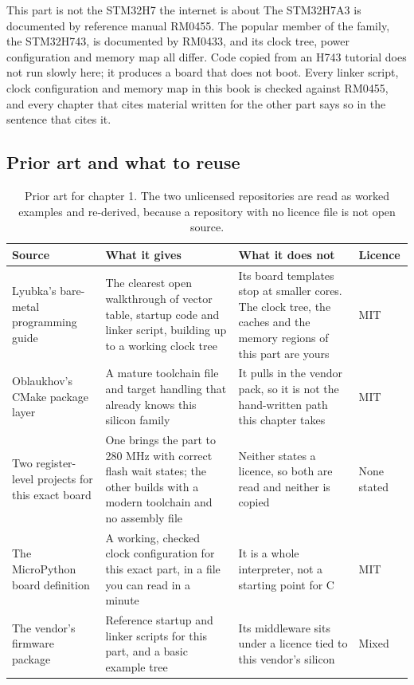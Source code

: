 \begin{note}{This part is not the STM32H7 the internet is about}
The STM32H7A3 is documented by reference manual RM0455. The popular member of
the family, the STM32H743, is documented by RM0433, and its clock tree, power
configuration and memory map all differ. Code copied from an H743 tutorial does
not run slowly here; it produces a board that does not boot. Every linker
script, clock configuration and memory map in this book is checked against
RM0455, and every chapter that cites material written for the other part says so
in the sentence that cites it.
\end{note}

\subsection*{Prior art and what to reuse}

\begin{table}[H]\centering\small
\begin{tabular}{p{34mm}p{46mm}p{38mm}p{20mm}}
\toprule
Source & What it gives & What it does not & Licence \\
\midrule
Lyubka's bare-metal programming guide & The clearest open walkthrough of vector table, startup code and linker script, building up to a working clock tree & Its board templates stop at smaller cores. The clock tree, the caches and the memory regions of this part are yours & MIT \\
Oblaukhov's CMake package layer & A mature toolchain file and target handling that already knows this silicon family & It pulls in the vendor pack, so it is not the hand-written path this chapter takes & MIT \\
Two register-level projects for this exact board & One brings the part to 280 MHz with correct flash wait states; the other builds with a modern toolchain and no assembly file & Neither states a licence, so both are read and neither is copied & None stated \\
The MicroPython board definition & A working, checked clock configuration for this exact part, in a file you can read in a minute & It is a whole interpreter, not a starting point for C & MIT \\
The vendor's firmware package & Reference startup and linker scripts for this part, and a basic example tree & Its middleware sits under a licence tied to this vendor's silicon & Mixed \\
\bottomrule
\end{tabular}
\caption{Prior art for chapter 1. The two unlicensed repositories are read as worked examples and re-derived, because a repository with no licence file is not open source.}
\end{table}

